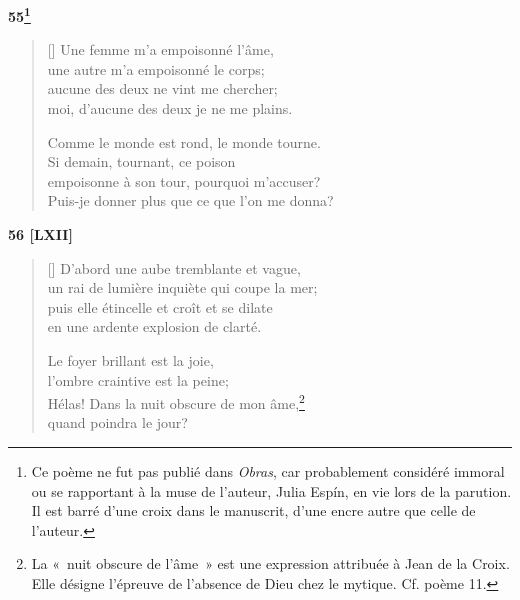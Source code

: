 \documentclass[a4paper,12pt]{book}
\begin{document}
\bigskip

\begin{center}
  \textbf{55\footnote{Ce poème ne fut pas publié dans \emph{Obras},
    car probablement considéré immoral ou se rapportant à la muse
    de l'auteur, Julia Espín, en vie lors de la parution. Il est barré
    d'une croix dans le manuscrit, d'une encre autre que celle de
    l'auteur.}}
\end{center}

\settowidth{\versewidth}{Puis-je donner plus que ce que l'on me donna?}

\begin{verse}[\versewidth]
  Une femme m'a empoisonné l'âme, \\
  une autre m'a empoisonné le corps; \\
  aucune des deux ne vint me chercher; \\
  moi, d'aucune des deux je ne me plains.

  Comme le monde est rond, le monde tourne. \\
  Si demain, tournant, ce poison \\
  empoisonne à son tour, pourquoi m'accuser? \\
  Puis-je donner plus que ce que l'on me donna?
\end{verse}

\bigskip

\begin{center}
  \textbf{56 [LXII]}
\end{center}

\settowidth{\versewidth}{puis elle étincelle et croît et se dilate}

\begin{verse}[\versewidth]
  D'abord une aube tremblante et vague, \\
  un rai de lumière inquiète qui coupe la mer; \\
  puis elle étincelle et croît et se dilate \\
  en une ardente explosion de clarté.

  Le foyer brillant est la joie, \\
  l'ombre craintive est la peine; \\
  Hélas! Dans la nuit obscure de mon âme,\footnote{La «~nuit obscure de
  l'âme~» est une expression attribuée à Jean de la Croix. Elle
  désigne l'épreuve de l'absence de Dieu chez le mytique. Cf. poème 11.} \\
  quand poindra le jour?
\end{verse}
\end{document}
